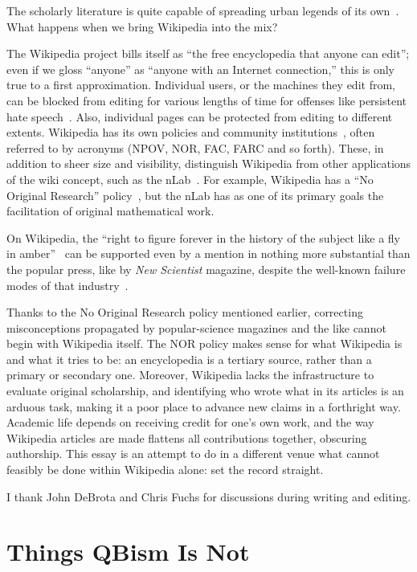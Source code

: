 \documentclass[aps,pra,superscriptaddress,12pt,tightenlines,nofootinbib]{revtex4-2}
\newcommand{\booktitle}{\textsl}
\begin{document}
The scholarly literature is quite capable of spreading urban legends
of its own~\cite{Rekdal2014}.  What happens when we bring
Wikipedia into the mix?

The Wikipedia project bills itself as ``the free encyclopedia that
anyone can edit''; even if we gloss ``anyone'' as ``anyone with an
Internet connection,'' this is only true to a first approximation.
Individual users, or the machines they edit from, can be blocked from
editing for various lengths of time for offenses like persistent hate
speech~\cite{Ferguson2014}.  Also, individual pages can be protected
from editing to different extents.  Wikipedia has its own policies and
community institutions~\cite{Paling2015}, often referred to by
acronyms (NPOV, NOR, FAC, FARC and so forth).  These, in addition to
sheer size and visibility, distinguish Wikipedia from other
applications of the wiki concept, such as the nLab~\cite{nLab}.  For
example, Wikipedia has a ``No Original Research'' policy~\cite{WPNOR},
but the nLab has as one of its primary goals the facilitation of
original mathematical work.

On Wikipedia, the ``right to figure forever in the history of the
subject like a fly in amber''~\cite{James1909} can be supported even
by a mention in nothing more substantial than the popular press, like
by \booktitle{New Scientist} magazine, despite the well-known failure
modes of that industry~\cite[p.\ 2221]{Fuchs2014}.

Thanks to the No Original Research policy mentioned earlier,
correcting misconceptions propagated by popular-science magazines and
the like cannot begin with Wikipedia itself.  The NOR policy makes
sense for what Wikipedia is and what it tries to be: an encyclopedia
is a tertiary source, rather than a primary or secondary one.
Moreover, Wikipedia lacks the infrastructure to evaluate original
scholarship, and identifying who wrote what in its articles is an
arduous task, making it a poor place to advance new claims in a
forthright way.  Academic life depends on receiving credit for one's
own work, and the way Wikipedia articles are made flattens all
contributions together, obscuring authorship.  This essay is an
attempt to do in a different venue what cannot feasibly be done within
Wikipedia alone: set the record straight.

\bigskip

I thank John DeBrota and Chris Fuchs for discussions during writing
and editing.

\appendix
\section{Things QBism Is Not}
\end{document}
